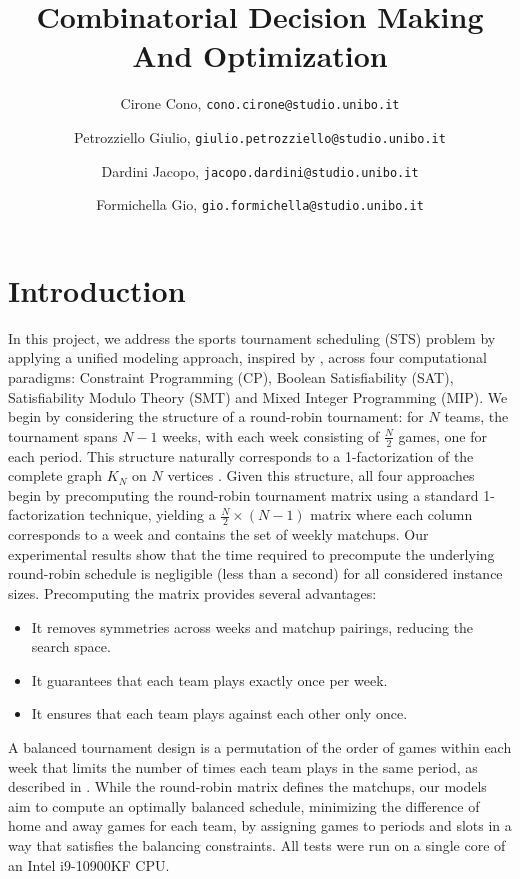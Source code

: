 \documentclass{article}
\title{Combinatorial Decision Making And Optimization}
\author{
  Cirone Cono, \texttt{cono.cirone@studio.unibo.it}
  \and
  Petrozziello Giulio, \texttt{giulio.petrozziello@studio.unibo.it} 
  \and
  Dardini Jacopo, \texttt{jacopo.dardini@studio.unibo.it}
  \and
  Formichella Gio, \texttt{gio.formichella@studio.unibo.it}
}
\date{}
\begin{document}
\maketitle


\section{Introduction}
In this project, we address the sports tournament scheduling (STS) problem by applying a unified modeling approach, inspired by \cite{10.1007/10704567_6}, across four computational paradigms: Constraint Programming (CP), Boolean Satisfiability (SAT), Satisfiability Modulo Theory (SMT) and Mixed Integer Programming (MIP).
We begin by considering the structure of a round-robin tournament: for $N$ teams, the tournament spans $N-1$ weeks, with each week consisting of $\frac{N}{2}$ games, one for each period. This structure naturally corresponds to a 1-factorization of the complete graph $K_N$ on $N$ vertices \cite{Dinitz2006RoundRobin}. Given this structure, all four approaches begin by precomputing the round-robin tournament matrix using a standard 1-factorization technique, yielding a $\frac{N}{2} \times (N-1)$ matrix where each column corresponds to a week and contains the set of weekly matchups. Our experimental results show that the time required to precompute the underlying round-robin schedule is negligible (less than a second) for all considered instance sizes. Precomputing the matrix provides several advantages:

\begin{itemize}
  \item It removes symmetries across weeks and matchup pairings, reducing the search space.
  \item It guarantees that each team plays exactly once per week.
  \item It ensures that each team plays against each other only once.
\end{itemize}
A balanced tournament design is a permutation of the order of games within each week that limits the number of times each team plays in the same period, as described in \cite{Lamken2006BalancedTournamentDesigns}.
While the round-robin matrix defines the matchups, our models aim to compute an optimally balanced schedule, minimizing the difference of home and away games for each team, by assigning games to periods and slots in a way that satisfies the balancing constraints. 
All tests were run on a single core of an Intel i9-10900KF CPU. 
\end{document}
